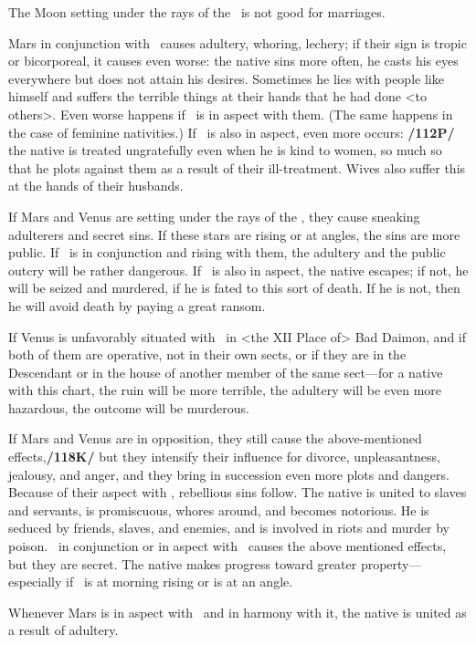 The Moon setting under the rays of the \Sun\, is not good for marriages. 

Mars in conjunction with \Mercury\, causes adultery, whoring, lechery; if their sign is tropic or bicorporeal, it causes even worse: the native sins more often, he casts his eyes everywhere but does not attain his desires. Sometimes he lies with people like himself and suffers the terrible things at their hands that he had done <to others>. Even
worse happens if \Mercury\, is in aspect with them. (The same happens in the case of feminine nativities.) If \Saturn\, is also in aspect, even more occurs: \textbf{/112P/} the native is treated ungratefully even when he is kind to women, so much so that he plots against them as a result of their ill-treatment. Wives also suffer this at the hands of their husbands.

If Mars and Venus are setting under the rays of the \Sun, they cause sneaking adulterers and secret sins.
If these stars are rising or at angles, the sins are more public. If \Mercury\, is in conjunction and rising with
them, the adultery and the public outcry will be rather dangerous. If \Jupiter\, is also in aspect, the native
escapes; if not, he will be seized and murdered, if he is fated to this sort of death. If he is not, then he will
avoid death by paying a great ransom. 

If Venus is unfavorably situated with \Mars\, in <the XII Place of> Bad Daimon, and if both of them are operative, not in their own sects, or if they are in the Descendant or in the house of another member of the same sect—for a native with this chart, the ruin will be more terrible,
the adultery will be even more hazardous, the outcome will be murderous. 

If Mars and Venus are in opposition, they still cause the above-mentioned effects,\textbf{/118K/} but they intensify their influence for
divorce, unpleasantness, jealousy, and anger, and they bring in succession even more plots and dangers. Because of their aspect with \Mercury, rebellious sins follow. The native is united to slaves and servants, is promiscuous, whores around, and becomes notorious. He is seduced by friends, slaves, and enemies, and is involved in riots and murder by poison.
\Jupiter\, in conjunction or in aspect with \Venus\, causes the above mentioned effects, but they are secret. The native makes progress toward greater property—especially if \Jupiter\, is at morning rising or is at an angle.

Whenever Mars is in aspect with \Venus\, and in harmony with it, the native is united as a result of adultery. 

